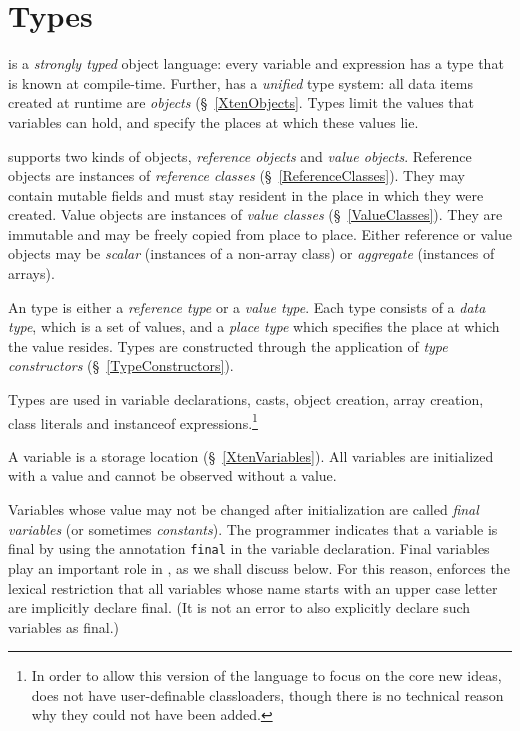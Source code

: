 \chapter{Types}
\label{XtenTypes}

{}\Xten{} is a {\em strongly typed} object language: every variable
and expression has a type that is known at compile-time. Further,
\Xten{} has a {\em unified} type system: all data items created at
runtime are {\em objects} (\S~\ref{XtenObjects}. Types limit the
values that variables can hold, and specify the places at which these
values lie.

{}\Xten{} supports two kinds of objects, {\em reference objects} and
{\em value objects}.  Reference objects are instances of {\em
reference classes} (\S~\ref{ReferenceClasses}). They may contain
mutable fields and must stay resident in the place in which they were
created. Value objects are instances of {\em value classes}
(\S~\ref{ValueClasses}). They are immutable and may be freely copied
from place to place. Either reference or value objects may be 
{\em scalar} (instances of a non-array class) or {\em aggregate} (instances
of arrays).

An \Xten{} type is either a {\em reference type} or a {\em value
type}.  Each type consists of a {\em data type}, which is a set of
values, and a {\em place type} which specifies the place at which the
value resides.  Types are constructed through the application of {\em
type constructors} (\S~\ref{TypeConstructors}).


Types are used in variable declarations, casts, object creation, array
creation, class literals and {\cf instanceof} expressions.\footnote{In
order to allow this version of the language to focus on the core new
ideas, \XtenCurrVer{} does not have user-definable classloaders,
though there is no technical reason why they could not have been
added.}

A variable is a storage location (\S~\ref{XtenVariables}). All
variables are initialized with a value and cannot be observed without
a value. 

Variables whose value may not be changed after initialization are
called {\em final variables} (or sometimes {\em constants}).  The
programmer indicates that a variable is final by using the annotation
{\tt final} in the variable declaration.  Final variables play an
important role in \Xten{}, as we shall discuss below. For this reason,
\Xten{} enforces the lexical restriction that all variables whose name
starts with an upper case letter are implicitly declare final. (It is
not an error to also explicitly declare such variables as final.)

